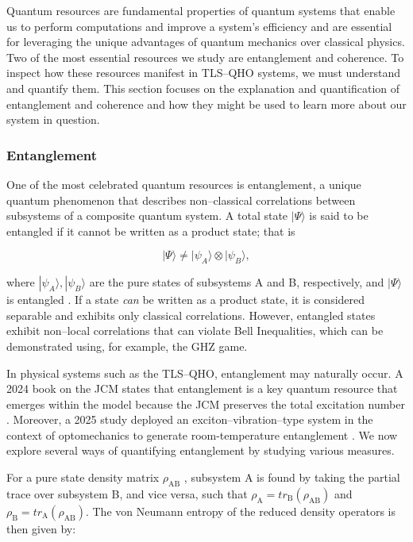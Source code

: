 \documentclass[11pt]{article}
\newcounter{subsubsubsection}[subsubsection]
\begin{document}
Quantum resources are fundamental properties of quantum systems that enable us to perform computations and improve a system's efficiency and are essential for leveraging the unique advantages of quantum mechanics over classical physics. Two of the most essential resources we study are entanglement and coherence. To inspect how these resources manifest in TLS--QHO systems, we must understand and quantify them. This section focuses on the explanation and quantification of entanglement and coherence and how they might be used to learn more about our system in question. 

\subsubsection{Entanglement}

One of the most celebrated quantum resources is entanglement, a unique quantum phenomenon that describes non--classical correlations between subsystems of a composite quantum system. A total state $|\Psi\rangle$ is said to be entangled if it cannot be written as a product state; that is

\begin{equation}
    |\Psi\rangle \neq |\psi_A\rangle \otimes |\psi_B\rangle,
\end{equation}

where $|\psi_A\rangle, |\psi_B\rangle$ are the pure states of subsystems A and B, respectively, and $|\Psi\rangle$ is entangled \cite{Entanglement1999-Overview_&REE}. If a state \textit{can} be written as a product state, it is considered separable and exhibits only classical correlations. However, entangled states exhibit non--local correlations that can violate Bell Inequalities, which can be demonstrated using, for example, the GHZ game. 

In physical systems such as the TLS--QHO, entanglement may  naturally occur. A 2024 book on the JCM states that entanglement is a key quantum resource that emerges within the model because the JCM preserves the total excitation number \cite{General2024-JC_overview}. Moreover, a 2025 study deployed an exciton--vibration--type system in the context of optomechanics to generate room-temperature entanglement \cite{Entanglement2025-ExVib_roomtemp}. We now explore several ways of quantifying entanglement by studying various measures.


For a pure state density matrix $\rho_{\scriptscriptstyle \text{AB}}$ \cite{Entanglement1999-Overview_&REE}, subsystem A is  found by taking the partial trace over subsystem B, and vice versa, such that $\rho_{\scriptscriptstyle \text{A}} = tr_{\scriptscriptstyle \text{B}}(\rho_{\scriptscriptstyle \text{AB}})$ and $\rho_{\scriptscriptstyle \text{B}} = tr_{\scriptscriptstyle \text{A}}(\rho_{\scriptscriptstyle \text{AB}})$. The von Neumann entropy of the reduced density operators is then given by:
\end{document}
